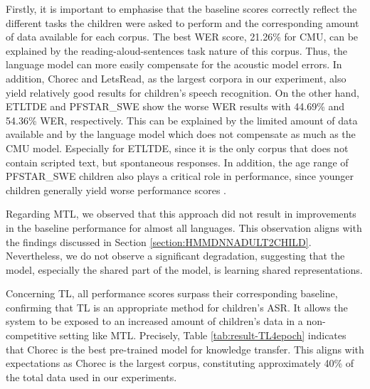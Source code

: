 Firstly, it is important to emphasise that the baseline scores correctly reflect the different tasks the children were asked to perform and the corresponding amount of data available for each corpus. The best \ac{WER} score, 21.26\% for CMU, can be explained by the reading-aloud-sentences task nature of this corpus. Thus, the language model can more easily compensate for the acoustic model errors. In addition, Chorec and LetsRead, as the largest corpora in our experiment, also yield relatively good results for children's speech recognition. On the other hand, ETLTDE and PFSTAR\_SWE show the worse \ac{WER} results with 44.69\%  and 54.36\% \ac{WER}, respectively. This can be explained by the limited amount of data available and by the language model which does not compensate as much as the CMU model. Especially for ETLTDE, since it is the only corpus that does not contain scripted text, but spontaneous responses. In addition, the age range of PFSTAR\_SWE children also plays a critical role in performance, since younger children generally yield worse performance scores \cite{TFchildren}.

Regarding \ac{MTL}, we observed that this approach did not result in improvements in the baseline performance for almost all languages. This observation aligns with the findings discussed in Section \ref{section:HMMDNNADULT2CHILD}. Nevertheless, we do not observe a significant degradation, suggesting that the model, especially the shared part of the model, is learning shared representations. 



Concerning \ac{TL}, all performance scores surpass their corresponding baseline, confirming that \ac{TL} is an appropriate method for children's \ac{ASR}. It allows the system to be exposed to an increased amount of children's data in a non-competitive setting like \ac{MTL}. Precisely, Table \ref{tab:result-TL4epoch} indicates that Chorec is the best pre-trained model for knowledge transfer. This aligns with expectations as Chorec is the largest corpus, constituting approximately 40\% of the total data used in our experiments.



